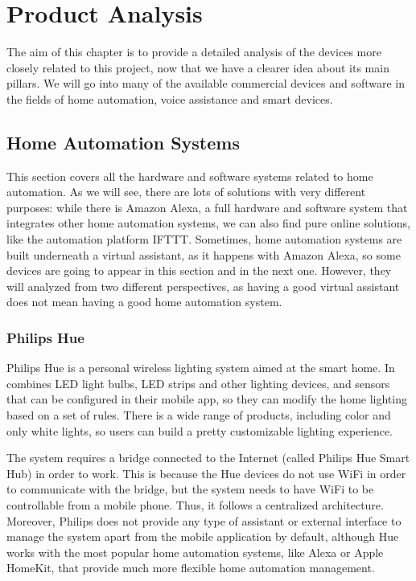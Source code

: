 \chapter{Product Analysis}

The aim of this chapter is to provide a detailed analysis of the devices more closely related to this project, now that we have a
clearer idea about its main pillars. We will go into many of the available commercial devices and software in the fields of home
automation, voice assistance and smart devices.

\section{Home Automation Systems}
This section covers all the hardware and software systems related to home automation. As we will see, there are lots of solutions
with very different purposes: while there is Amazon Alexa, a full hardware and software system that integrates other home automation
systems, we can also find pure online solutions, like the automation platform IFTTT. Sometimes, home automation systems are
built underneath a virtual assistant, as it happens with Amazon Alexa, so some devices are going to appear in this section and in the
next one. However, they will analyzed from two different perspectives, as having a good virtual assistant does not mean having a
good home automation system.

\subsection{Philips Hue}
Philips Hue is a personal wireless lighting system aimed at the smart home. In combines LED light bulbs, LED strips and other
lighting devices, and sensors that can be configured in their mobile app, so they can modify the home lighting based on a set of
rules. There is a wide range of products, including color and only white lights, so users can build a pretty customizable lighting
experience.\cite{philipsHueMeethue}

The system requires a bridge connected to the Internet (called Philips Hue Smart Hub) in order to work. This is because the Hue
devices do not use WiFi in order to communicate with the bridge, but the system needs to have WiFi to be controllable from a
mobile phone. Thus, it follows a centralized architecture. Moreover, Philips does not provide any type of assistant or external interface
to manage the system apart from the mobile application by default, although Hue works with the most popular home automation
systems, like Alexa or Apple HomeKit, that provide much more flexible home automation management.

